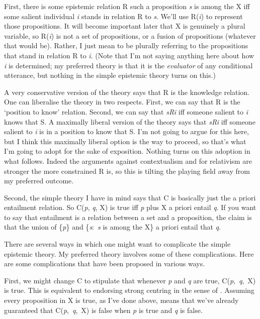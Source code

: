First, there is some epistemic relation R such a proposition \textit{s} is among the X iff some salient individual \textit{i} stands in relation R to \textit{s}. We'll use R(\textit{i}) to represent those propositions. It will become important later that X is genuinely a plural variable, so R(\textit{i}) is not a set of propositions, or a fusion of propositions (whatever that would be). Rather, I just mean to be plurally referring to the propositions that stand in relation R to \textit{i}. (Note that I'm not saying anything here about how \textit{i} is determined; my preferred theory is that it is the \textit{evaluator} of any conditional utterance, but nothing in the simple epistemic theory turns on this.)

A very conservative version of the theory says that R is the knowledge relation. One can liberalise the theory in two respects. First, we can say that R is the `position to know' relation. Second, we can say that \textit{sRi} iff someone salient to \textit{i} knows that S. A maximally liberal version of the theory says that \textit{sRi} iff someone salient to \textit{i} is in a position to know that S. I'm not going to argue for this here, but I think this maximally liberal option is the way to proceed, so that's what I'm going to adopt for the sake of exposition. Nothing turns on this adoption in what follows. Indeed the arguments against contextualism and for relativism are stronger the more constrained R is, so this is tilting the playing field away from my preferred outcome.

Second, the simple theory I have in mind says that C is basically just the a priori entailment relation. So C(\textit{p}, \textit{q}, X) is true iff \textit{p} plus X a priori entail \textit{q}. If you want to say that entailment is a relation between a set and a proposition, the claim is that the union of \{\textit{p}\} and \{\textit{s}:~\textit{s }is among the X\} a priori entail that \textit{q}.

There are several ways in which one might want to complicate the simple epistemic theory. My preferred theory involves some of these complications. Here are some complications that have been proposed in various ways.

First, we might change C to stipulate that whenever \textit{p} and \textit{q} are true, C(\textit{p},~\textit{q},~X) is true. This is equivalent to endorsing strong centring in the sense of \cite{Lewis1973a}. Assuming every proposition in X is true, as I've done above, means that we've already guaranteed that C(\textit{p},~\textit{q},~X) is false when \textit{p} is true and \textit{q} is false.

